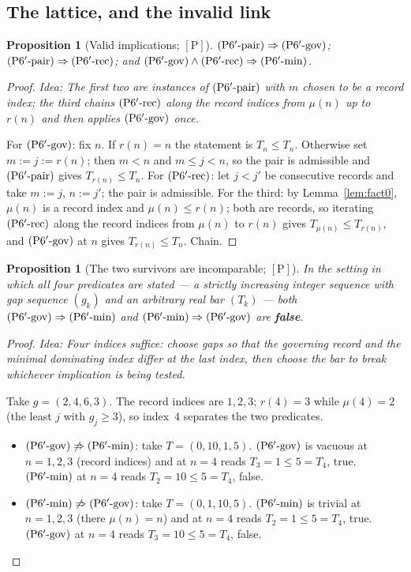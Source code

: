 \documentclass[11pt,a4paper]{article}
\theoremstyle{plain}
\newtheorem{proposition}[theorem]{Proposition}
\theoremstyle{definition}
\theoremstyle{remark}
\newcommand{\idea}[1]{\emph{Idea: #1}\par\smallskip}
\newcommand{\cP}{{[\mathrm{P}]}}
\newcommand{\Ppair}{\textup{(P6$'$-pair)}}
\newcommand{\Pgov}{\textup{(P6$'$-gov)}}
\newcommand{\Pmin}{\textup{(P6$'$-min)}}
\newcommand{\Prec}{\textup{(P6$'$-rec)}}
\begin{document}
\subsection{The lattice, and the invalid link}

\begin{proposition}[Valid implications; $\cP$]
\label{prop:implications}
$\Ppair \Rightarrow \Pgov$; \; $\Ppair \Rightarrow \Prec$; \; and
$\Pgov \wedge \Prec \Rightarrow \Pmin$.
\end{proposition}

\begin{proof}
\idea{The first two are instances of $\Ppair$ with $m$ chosen to be a record index; the third
chains $\Prec$ along the record indices from $\mu(n)$ up to $r(n)$ and then applies $\Pgov$
once.}
For $\Pgov$: fix $n$. If $r(n) = n$ the statement is $T_n \le T_n$. Otherwise set
$m := j := r(n)$; then $m < n$ and $m \le j < n$, so the pair is admissible and $\Ppair$ gives
$T_{r(n)} \le T_n$. For $\Prec$: let $j < j'$ be consecutive records and take $m := j$,
$n := j'$; the pair is admissible. For the third: by Lemma~\ref{lem:fact0}, $\mu(n)$ is a
record index and $\mu(n) \le r(n)$; both are records, so iterating $\Prec$ along the record
indices from $\mu(n)$ to $r(n)$ gives $T_{\mu(n)} \le T_{r(n)}$, and $\Pgov$ at $n$ gives
$T_{r(n)} \le T_n$. Chain.
\end{proof}

\begin{proposition}[The two survivors are incomparable; $\cP$]
\label{prop:incomparable}
In the setting in which all four predicates are stated --- a strictly increasing integer
sequence with gap sequence $(g_k)$ and an arbitrary real bar $(T_k)$ --- both
$\Pgov \Rightarrow \Pmin$ and $\Pmin \Rightarrow \Pgov$ are \textbf{false}.
\end{proposition}

\begin{proof}
\idea{Four indices suffice: choose gaps so that the governing record and the minimal
dominating index differ at the last index, then choose the bar to break whichever implication
is being tested.}
Take $g = (2,4,6,3)$. The record indices are $1,2,3$; $r(4) = 3$ while
$\mu(4) = 2$ (the least $j$ with $g_j \ge 3$), so index~$4$ separates the two predicates.
\begin{itemize}
\item $\Pgov \not\Rightarrow \Pmin$: take $T = (0,10,1,5)$. $\Pgov$ is vacuous at
  $n = 1,2,3$ (record indices) and at $n = 4$ reads $T_3 = 1 \le 5 = T_4$, true. $\Pmin$ at
  $n = 4$ reads $T_2 = 10 \le 5 = T_4$, false.
\item $\Pmin \not\Rightarrow \Pgov$: take $T = (0,1,10,5)$. $\Pmin$ is trivial at
  $n = 1,2,3$ (there $\mu(n) = n$) and at $n = 4$ reads $T_2 = 1 \le 5 = T_4$, true. $\Pgov$
  at $n = 4$ reads $T_3 = 10 \le 5 = T_4$, false.
\end{itemize}
\end{proof}
\end{document}
